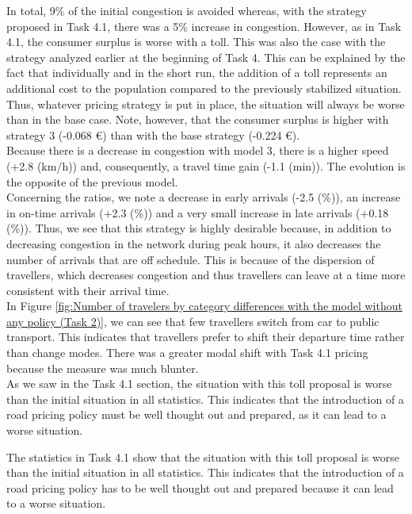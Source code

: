 \documentclass[a4paper, 12pt,oneside]{article}
\begin{document}
In total, 9\% of the initial congestion is avoided whereas, with the strategy proposed in Task 4.1, there was a 5\% increase in congestion. However, as in Task 4.1, the consumer surplus is worse with a toll. This was also the case with the strategy analyzed earlier at the beginning of Task 4. This can be explained by the fact that individually and in the short run, the addition of a toll represents an additional cost to the population compared to the previously stabilized situation. Thus, whatever pricing strategy is put in place, the situation will always be worse than in the base case. Note, however, that the consumer surplus is higher with strategy 3 (-0.068 €) than with the base strategy (-0.224 €).\\

Because there is a decrease in congestion with model 3, there is a higher speed (+2.8 (km/h)) and, consequently, a travel time gain (-1.1 (min)). The evolution is the opposite of the previous model.\\

Concerning the ratios, we note a decrease in early arrivals (-2.5 (\%)), an increase in on-time arrivals (+2.3 (\%)) and a very small increase in late arrivals (+0.18 (\%)). Thus, we see that this strategy is highly desirable because, in addition to decreasing congestion in the network during peak hours, it also decreases the number of arrivals that are off schedule. This is because of the dispersion of travellers, which decreases congestion and thus travellers can leave at a time more consistent with their arrival time.\\

In Figure \ref{fig:Number of travelers by category differences with the model without any policy (Task 2)}, we can see that few travellers switch from car to public transport. This indicates that travellers prefer to shift their departure time rather than change modes. There was a greater modal shift with Task 4.1 pricing because the measure was much blunter.\\

As we saw in the Task 4.1 section, the situation with this toll proposal is worse than the initial situation in all statistics. This indicates that the introduction of a road pricing policy must be well thought out and prepared, as it can lead to a worse situation.

The statistics in Task 4.1 show that the situation with this toll proposal is worse than the initial situation in all statistics. This indicates that the introduction of a road pricing policy has to be well thought out and prepared because it can lead to a worse situation.\\
\end{document}

